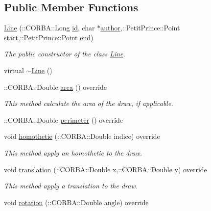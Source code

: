 \subsection*{Public Member Functions}
\begin{DoxyCompactItemize}
\item 
\hyperlink{class_line_a9b4f1b2c1ae0d77479cc5d3dca18072b}{Line} (\+::C\+O\+R\+B\+A\+::\+Long \hyperlink{class_draw_a1bf27c5a59da9002d55936c947dce2cc}{id}, char $\ast$\hyperlink{class_draw_a4781c654db63e069c8c5be017f6ccc34}{author},\+::Petit\+Prince\+::\+Point \hyperlink{class_line_a98203eecc32db053609ec4ed976c591e}{start},\+::Petit\+Prince\+::\+Point \hyperlink{class_line_a0a63ba42fc17f9bcef9b26429fac7b05}{end})
\begin{DoxyCompactList}\small\item\em The public constructor of the class \hyperlink{class_line}{Line}. \end{DoxyCompactList}\item 
virtual \hyperlink{class_line_a4a95bafcefa28672b3999deb011b9e50}{$\sim$\+Line} ()
\item 
\+::C\+O\+R\+B\+A\+::\+Double \hyperlink{class_line_ad1956c68a8ff8a87b02b83cb2fee8935}{area} () override
\begin{DoxyCompactList}\small\item\em This method calculate the area of the draw, if applicable. \end{DoxyCompactList}\item 
\+::C\+O\+R\+B\+A\+::\+Double \hyperlink{class_line_a861e93bdb982dc926d3bea1d4ea225d6}{perimeter} () override
\item 
void \hyperlink{class_line_ab59cbe808e7ffcdb91a6e423c060e9b4}{homothetie} (\+::C\+O\+R\+B\+A\+::\+Double indice) override
\begin{DoxyCompactList}\small\item\em This method apply an homothetie to the draw. \end{DoxyCompactList}\item 
void \hyperlink{class_line_a81fd5b1d3df9de390ac24bac9a6f4c70}{translation} (\+::C\+O\+R\+B\+A\+::\+Double x,\+::C\+O\+R\+B\+A\+::\+Double y) override
\begin{DoxyCompactList}\small\item\em This method apply a translation to the draw. \end{DoxyCompactList}\item 
void \hyperlink{class_line_a5019eac9e777c17d47ebf7585ef4cf12}{rotation} (\+::C\+O\+R\+B\+A\+::\+Double angle) override

\end{DoxyCompactItemize}
